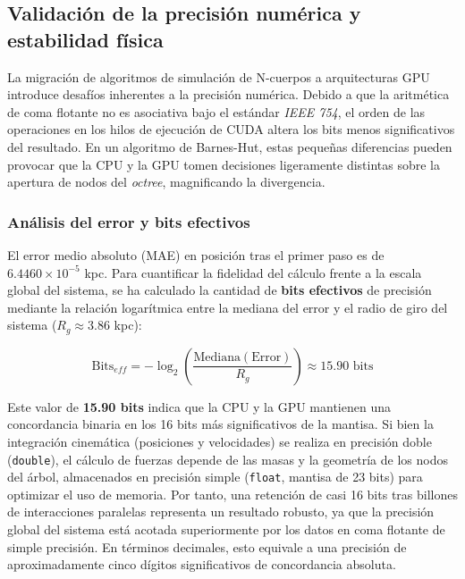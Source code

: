 \subsection{Validación de la precisión numérica y estabilidad física}\label{subsec:validacion-de-la-precision-numerica-y-estabilidad-fisica}

La migración de algoritmos de simulación de N-cuerpos a arquitecturas GPU introduce desafíos inherentes a la precisión numérica.
Debido a que la aritmética de coma flotante no es asociativa bajo el estándar \textit{IEEE 754}, el orden de las operaciones en los hilos de ejecución de CUDA altera los bits menos significativos del resultado.
En un algoritmo de Barnes-Hut, estas pequeñas diferencias pueden provocar que la CPU y la GPU tomen decisiones ligeramente distintas sobre la apertura de nodos del \textit{octree}, magnificando la divergencia.

\subsubsection{Análisis del error y bits efectivos}
El error medio absoluto (MAE) en posición tras el primer paso es de $6.4460 \times 10^{-5}$ kpc.
Para cuantificar la fidelidad del cálculo frente a la escala global del sistema, se ha calculado la cantidad de \textbf{bits efectivos} de precisión mediante la relación logarítmica entre la mediana del error y el radio de giro del sistema ($R_g \approx 3.86$ kpc):

\begin{equation}
    \text{Bits}_{eff} = -\log_{2} \left( \frac{\text{Mediana}(\text{Error})}{R_g} \right) \approx 15.90 \text{ bits}
\end{equation}

Este valor de \textbf{15.90 bits} indica que la CPU y la GPU mantienen una concordancia binaria en los 16 bits más significativos de la mantisa.
Si bien la integración cinemática (posiciones y velocidades) se realiza en precisión doble (\texttt{double}), el cálculo de fuerzas depende de las masas y la geometría de los nodos del árbol, almacenados en precisión simple (\texttt{float}, mantisa de 23 bits) para optimizar el uso de memoria.
Por tanto, una retención de casi 16 bits tras billones de interacciones paralelas representa un resultado robusto, ya que la precisión global del sistema está acotada superiormente por los datos en coma flotante de simple precisión.
En términos decimales, esto equivale a una precisión de aproximadamente cinco dígitos significativos de concordancia absoluta.

